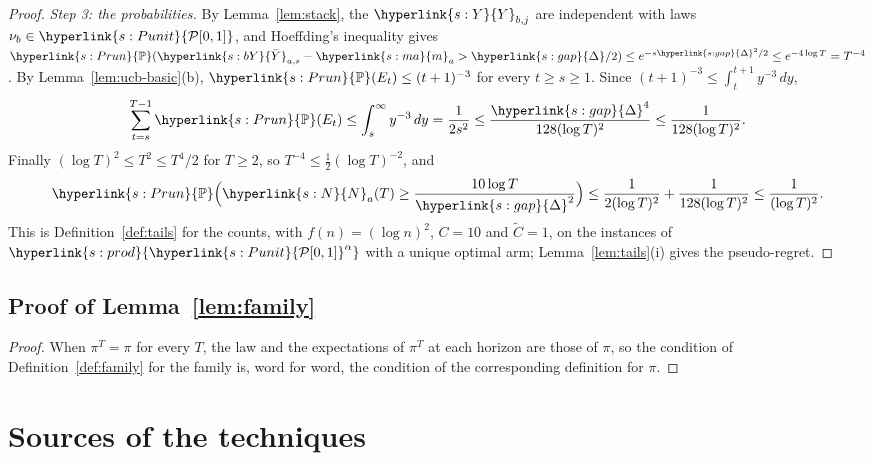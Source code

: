 \documentclass[11pt]{article}
\newcommand{\Prob}{\mathbb{P}}
\newcommand{\sy}[2]{{\hyperlink{#1}{#2}}}
\newcommand{\Punit}{\sy{s:Punit}{\mathcal{P}[0,1]}}
\newcommand{\marm}{\sy{s:ma}{m}}
\newcommand{\gap}{\sy{s:gap}{\Delta}}
\newcommand{\powc}[1]{\sy{s:prod}{#1^{\alpha}}}
\newcommand{\Pru}{\sy{s:Prun}{\Prob}}
\newcommand{\Np}{\sy{s:N}{N}}
\newcommand{\Yc}{\sy{s:Y}{Y}}
\newcommand{\bY}{\sy{s:bY}{\bar{Y}}}
\begin{document}
\begin{proof}
\emph{Step 3: the probabilities.} By Lemma~\ref{lem:stack}, the $\Yc_{b,j}$ are independent with laws
$\nu_b\in\Punit$, and Hoeffding's inequality gives
$\Pru(\bY_{a,s}-\marm_a>\gap/2)\le e^{-s\gap^2/2}\le e^{-4\log T}=T^{-4}$. By
Lemma~\ref{lem:ucb-basic}(b), $\Pru(E_t)\le(t+1)^{-3}$ for every $t\ge s\ge1$. Since
$(t+1)^{-3}\le\int_t^{t+1}y^{-3}\,dy$,
\begin{equation*}
  \sum_{t=s}^{T-1}\Pru(E_t)\le\int_s^\infty y^{-3}\,dy=\frac1{2s^2}\le\frac{\gap^4}{128(\log T)^2}\le\frac1{128(\log T)^2}.
\end{equation*}
Finally $(\log T)^2\le T^2\le T^4/2$ for $T\ge2$, so $T^{-4}\le\frac12(\log T)^{-2}$, and
\begin{equation*}
  \Pru\Big(\Np_a(T)\ge\frac{10\log T}{\gap^2}\Big)\le\frac{1}{2(\log T)^2}+\frac{1}{128(\log T)^2}\le\frac{1}{(\log T)^2}.
\end{equation*}
This is Definition~\ref{def:tails} for the counts, with $f(n)=(\log n)^2$, $C=10$ and $\tilde C=1$, on the
instances of $\powc{\Punit}$ with a unique optimal arm; Lemma~\ref{lem:tails}(i) gives the pseudo-regret.
\end{proof}

\subsection{Proof of Lemma~\ref{lem:family}}\label{sec:proof-family}

\begin{proof}
When $\pi^T=\pi$ for every $T$, the law and the expectations of $\pi^T$ at each horizon are those of
$\pi$, so the condition of Definition~\ref{def:family} for the family is, word for word, the condition
of the corresponding definition for $\pi$.
\end{proof}

\section{Sources of the techniques}\label{sec:attribution}
\end{document}
